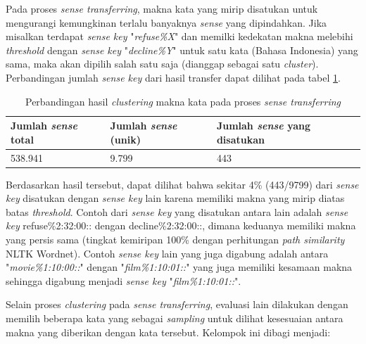 Pada proses \textit{sense transferring}, makna kata yang mirip disatukan untuk mengurangi kemungkinan terlalu banyaknya \textit{sense} yang dipindahkan. Jika misalkan terdapat \textit{sense key} "\textit{refuse\%X}" dan memilki kedekatan makna melebihi \textit{threshold} dengan \textit{sense key} "\textit{decline\%Y}" untuk satu kata (Bahasa Indonesia) yang sama, maka akan dipilih salah satu saja (dianggap sebagai satu \textit{cluster}). Perbandingan jumlah \textit{sense key} dari hasil transfer dapat dilihat pada tabel \ref{table:sense-transfer-clustering}.

\begin{table}
	\centering
	\caption{Perbandingan hasil \textit{clustering} makna kata pada proses \textit{sense transferring}}
	\label{table:sense-transfer-clustering}
	\begin{tabular}{|p{4cm}|p{4cm}|p{4cm}|}
		\hline
		Jumlah \textit{sense} total & Jumlah \textit{sense} (unik) & Jumlah \textit{sense} yang disatukan
		\\ \hline
		538.941 & 9.799 & 443 \\ \hline
	\end{tabular}
\end{table}

Berdasarkan hasil tersebut, dapat dilihat bahwa sekitar 4\% (443/9799) dari \textit{sense key} disatukan dengan \textit{sense key} lain karena memiliki makna yang mirip diatas batas \textit{threshold}. Contoh dari \textit{sense key} yang disatukan antara lain adalah \textit{sense key} refuse\%2:32:00:: dengan decline\%2:32:00::, dimana keduanya memiliki makna yang persis sama (tingkat kemiripan 100\% dengan perhitungan \textit{path similarity} NLTK Wordnet). Contoh \textit{sense key} lain yang juga digabung adalah antara "\textit{movie\%1:10:00::}" dengan "\textit{film\%1:10:01::}" yang juga memiliki kesamaan makna sehingga digabung menjadi \textit{sense key} "\textit{film\%1:10:01::}".

Selain proses \textit{clustering} pada \textit{sense transferring}, evaluasi lain dilakukan dengan memilih beberapa kata yang sebagai \textit{sampling} untuk dilihat kesesuaian antara makna yang diberikan dengan kata tersebut. Kelompok ini dibagi menjadi:

